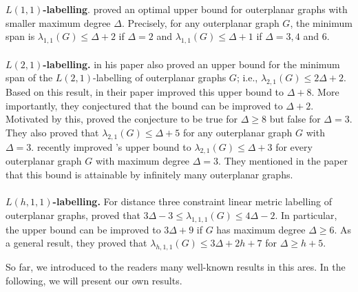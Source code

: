 \textbf{$L(1,1)$-labelling}. \cite{agnarsson04} proved an optimal upper bound for outerplanar graphs with smaller maximum degree $\Delta$. Precisely, for any outerplanar graph $G$, the minimum span is $\lambda_{1,1}(G) \le \Delta+2$ if $\Delta=2$ and $\lambda_{1,1}(G) \le \Delta+1$ if $\Delta=3,4$ and $6$. 
\\
\\
\textbf{$L(2,1)$-labelling.} \cite{jonas93} in his paper also proved an upper bound for the minimum span of the $L(2,1)$-labelling of outerplanar graphs $G$; i.e., $\lambda_{2,1}(G) \le 2\Delta+2$. Based on this result, \cite{bodlaender04} in their paper improved this upper bound to $\Delta+8$. More importantly, they conjectured that the bound can be improved to $\Delta+2$. Motivated by this, \cite{calamoneri04} proved the conjecture to be true for $\Delta \ge 8$ but false for $\Delta=3$. They also proved that $\lambda_{2,1}(G) \le \Delta+5$ for any outerplanar graph $G$ with $\Delta=3$. \cite{zhou11} recently improved \citeauthor{calamoneri04}'s upper bound to $\lambda_{2,1}(G) \le \Delta+3$ for every outerplanar graph $G$ with maximum degree $\Delta=3$. They mentioned in the paper that this bound is attainable by infinitely many outerplanar graphs. 
\\
\\
\textbf{$L(h,1,1)$-labelling.} For distance three constraint linear metric labelling of outerplanar graphs, \cite{calamoneri07} proved that $3\Delta-3 \le \lambda_{1,1,1}(G) \le  4\Delta-2$. In particular, the upper bound can be improved to $3\Delta+9$ if $G$ has maximum degree $\Delta \ge 6$. As a general result, they proved that $\lambda_{h,1,1}(G) \le 3\Delta+2h+7$ for $\Delta \ge h+5$. 

So far, we introduced to the readers many well-known results in this ares. In the following, we will present our own results. 









